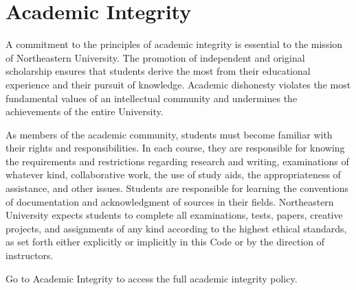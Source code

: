 \documentclass[letterpaper]{inzane_syllabus} %
\begin{document}



\vspace{0.1cm}
\section{Academic Integrity}
\vspace{0.05cm}

A commitment to the principles of academic integrity is essential to the mission of Northeastern University. The promotion of independent and original scholarship ensures that students derive the most from their educational experience and their pursuit of knowledge. Academic dishonesty violates the most fundamental values of an intellectual community and undermines the achievements of the entire University.

As members of the academic community, students must become familiar with their rights and responsibilities. In each course, they are responsible for knowing the requirements and restrictions regarding research and writing, examinations of whatever kind, collaborative work, the use of study aids, the appropriateness of assistance, and other issues. Students are responsible for learning the conventions of documentation and acknowledgment of sources in their fields. Northeastern University expects students to complete all examinations, tests, papers, creative projects, and assignments of any kind according to the highest ethical standards, as set forth either explicitly or implicitly in this Code or by the direction of instructors. 

Go to Academic Integrity \href{http://www.northeastern.edu/osccr/academic-integrity-policy/}{}  to access the full academic integrity policy.
\end{document}
